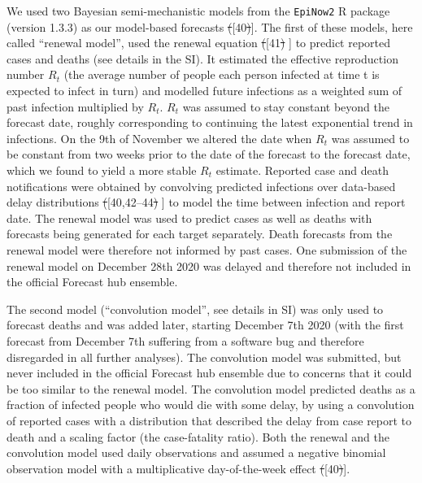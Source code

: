 \documentclass[10pt,letterpaper]{article} %
\providecommand{\DIFdeltex}[1]{{\protect\color{red}\sout{#1}}}                      %
\providecommand{\DIFaddbegin}{} %
\providecommand{\DIFaddend}{} %
\providecommand{\DIFdelbegin}{} %
\providecommand{\DIFdelend}{} %
\providecommand{\DIFdel}[1]{\texorpdfstring{\DIFdeltex{#1}}{}} %
\newcommand{\DIFscaledelfig}{0.5}
\newlength{\DIFdelgraphicswidth} %
\newlength{\DIFdelgraphicsheight} %
\newcommand{\DIFaddincludegraphics}[2][]{{\color{blue}\fbox{\DIFOincludegraphics[#1]{#2}}}} %
\newcommand{\DIFdelincludegraphics}[2][]{%
\sbox{\DIFdelgraphicsbox}{\DIFOincludegraphics[#1]{#2}}%
\settoboxwidth{\DIFdelgraphicswidth}{\DIFdelgraphicsbox} %
\settoboxtotalheight{\DIFdelgraphicsheight}{\DIFdelgraphicsbox} %
\scalebox{\DIFscaledelfig}{%
\parbox[b]{\DIFdelgraphicswidth}{\usebox{\DIFdelgraphicsbox}\\[-\baselineskip] \rule{\DIFdelgraphicswidth}{0em}}\llap{\resizebox{\DIFdelgraphicswidth}{\DIFdelgraphicsheight}{%
\setlength{\unitlength}{\DIFdelgraphicswidth}%
\begin{picture}(1,1)%
\thicklines\linethickness{2pt} %
{\color[rgb]{1,0,0}\put(0,0){\framebox(1,1){}}}%
{\color[rgb]{1,0,0}\put(0,0){\line( 1,1){1}}}%
{\color[rgb]{1,0,0}\put(0,1){\line(1,-1){1}}}%
\end{picture}%
}\hspace*{3pt}}} %
} %
\DeclareRobustCommand{\DIFaddbegin}{\DIFOaddbegin \let\includegraphics\DIFaddincludegraphics} %
\DeclareRobustCommand{\DIFaddend}{\DIFOaddend \let\includegraphics\DIFOincludegraphics} %
\DeclareRobustCommand{\DIFdelbegin}{\DIFOdelbegin \let\includegraphics\DIFdelincludegraphics} %
\DeclareRobustCommand{\DIFdelend}{\DIFOaddend \let\includegraphics\DIFOincludegraphics} %
\begin{document}
We used two Bayesian semi-mechanistic models from the \texttt{EpiNow2} R
package (version 1.3.3) as our model-based forecasts \DIFdelbegin \DIFdel{(}\DIFdelend \DIFaddbegin {[}\DIFaddend 40\DIFdelbegin \DIFdel{)}\DIFdelend \DIFaddbegin {]}\DIFaddend . The first
of these models, here called ``renewal model'', used the renewal
equation \DIFdelbegin \DIFdel{(}\DIFdelend \DIFaddbegin {[}\DIFaddend 41\DIFdelbegin \DIFdel{) }\DIFdelend \DIFaddbegin {]} \DIFaddend to predict reported cases and deaths (see details in
the SI). It estimated the effective reproduction number \(R_t\) (the
average number of people each person infected at time t is expected to
infect in turn) and modelled future infections as a weighted sum of past
infection multiplied by \(R_t\). \(R_t\) was assumed to stay constant
beyond the forecast date, roughly corresponding to continuing the latest
exponential trend in infections. On the 9th of November we altered the
date when \(R_t\) was assumed to be constant from two weeks prior to the
date of the forecast to the forecast date, which we found to yield a
more stable \(R_t\) estimate. Reported case and death notifications were
obtained by convolving predicted infections over data-based delay
distributions \DIFdelbegin \DIFdel{(}\DIFdelend \DIFaddbegin {[}\DIFaddend 40,42--44\DIFdelbegin \DIFdel{) }\DIFdelend \DIFaddbegin {]} \DIFaddend to model the time between infection and
report date. The renewal model was used to predict cases as well as
deaths with forecasts being generated for each target separately. Death
forecasts from the renewal model were therefore not informed by past
cases. One submission of the renewal model on December 28th 2020 was
delayed and therefore not included in the official Forecast hub
ensemble.

The second model (``convolution model'', see details in SI) was only
used to forecast deaths and was added later, starting December 7th 2020
(with the first forecast from December 7th suffering from a software bug
and therefore disregarded in all further analyses). The convolution
model was submitted, but never included in the official Forecast hub
ensemble due to concerns that it could be too similar to the renewal
model. The convolution model predicted deaths as a fraction of infected
people who would die with some delay, by using a convolution of reported
cases with a distribution that described the delay from case report to
death and a scaling factor (the case-fatality ratio). Both the renewal
and the convolution model used daily observations and assumed a negative
binomial observation model with a multiplicative day-of-the-week effect
\DIFdelbegin \DIFdel{(}\DIFdelend \DIFaddbegin {[}\DIFaddend 40\DIFdelbegin \DIFdel{)}\DIFdelend \DIFaddbegin {]}\DIFaddend .
\end{document}
